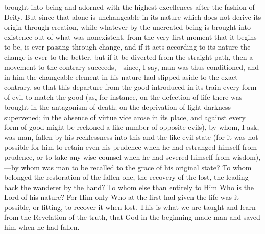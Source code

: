 brought into being and adorned with the highest excellences after the fashion of Deity. But since that alone is unchangeable in its nature which does not derive its origin through creation, while whatever by the uncreated being is brought into existence out of what was nonexistent, from the very first moment that it begins to be, is ever passing through change, and if it acts according to its nature the change is ever to the better, but if it be diverted from the straight path, then a movement to the contrary succeeds,—since, I say, man was thus conditioned, and in him the changeable element in his nature had slipped aside to the exact contrary, so that this departure from the good introduced in its train every form of evil to match the good (as, for instance, on the defection of life there was brought in the antagonism of death; on the deprivation of light darkness supervened; in the absence of virtue vice arose in its place, and against every form of good might be reckoned a like number of opposite evils), by whom, I ask, was man, fallen by his recklessness into this and the like evil state (for it was not possible for him to retain even his prudence when he had estranged himself from prudence, or to take any wise counsel when he had severed himself from wisdom),—by whom was man to be recalled to the grace of his original state? To whom belonged the restoration of the fallen one, the recovery of the lost, the leading back the wanderer by the hand? To whom else than entirely to Him Who is the Lord of his nature? For Him only Who at the first had given the life was it possible, or fitting, to recover it when lost. This is what we are taught and learn from the Revelation of the truth, that God in the beginning made man and saved him when he had fallen.


